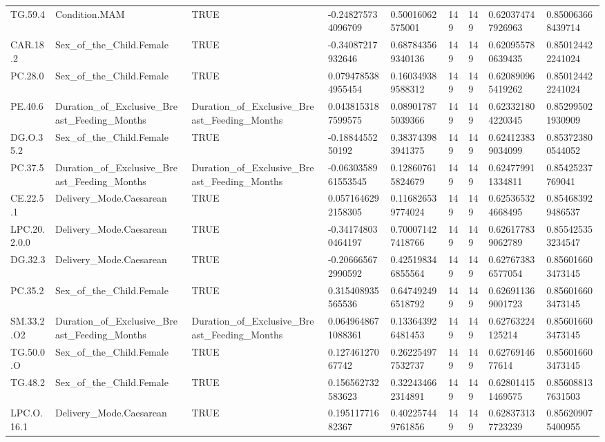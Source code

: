 \begin{longtable}{lllllllll}
TG.59.4 & Condition.MAM & TRUE & -0.248275734096709 & 0.50016062575001 & 149 & 149 & 0.620374747926963 & 0.850063668439714 \\
CAR.18.2 & Sex\_of\_the\_Child.Female & TRUE & -0.34087217932646 & 0.687843569340136 & 149 & 149 & 0.620955780639435 & 0.850124422241024 \\
PC.28.0 & Sex\_of\_the\_Child.Female & TRUE & 0.0794785384955454 & 0.160349389588312 & 149 & 149 & 0.620890965419262 & 0.850124422241024 \\
PE.40.6 & Duration\_of\_Exclusive\_Breast\_Feeding\_Months & Duration\_of\_Exclusive\_Breast\_Feeding\_Months & 0.0438153187599575 & 0.089017875039366 & 149 & 149 & 0.623321804220345 & 0.852995021930909 \\
DG.O.35.2 & Sex\_of\_the\_Child.Female & TRUE & -0.1884455250192 & 0.383743983941375 & 149 & 149 & 0.624123839034099 & 0.853723800544052 \\
PC.37.5 & Duration\_of\_Exclusive\_Breast\_Feeding\_Months & Duration\_of\_Exclusive\_Breast\_Feeding\_Months & -0.0630358961553545 & 0.128607615824679 & 149 & 149 & 0.624779911334811 & 0.85425237769041 \\
CE.22.5.1 & Delivery\_Mode.Caesarean & TRUE & 0.0571646292158305 & 0.116826539774024 & 149 & 149 & 0.625365324668495 & 0.854683929486537 \\
LPC.20.2.0.0 & Delivery\_Mode.Caesarean & TRUE & -0.341748030464197 & 0.700071427418766 & 149 & 149 & 0.626177839062789 & 0.855425353234547 \\
DG.32.3 & Delivery\_Mode.Caesarean & TRUE & -0.206665672990592 & 0.425198346855564 & 149 & 149 & 0.627673836577054 & 0.856016603473145 \\
PC.35.2 & Sex\_of\_the\_Child.Female & TRUE & 0.315408935565536 & 0.647492496518792 & 149 & 149 & 0.626911369001723 & 0.856016603473145 \\
SM.33.2.O2 & Duration\_of\_Exclusive\_Breast\_Feeding\_Months & Duration\_of\_Exclusive\_Breast\_Feeding\_Months & 0.0649648671088361 & 0.133643926481453 & 149 & 149 & 0.62763224125214 & 0.856016603473145 \\
TG.50.0.O & Sex\_of\_the\_Child.Female & TRUE & 0.12746127067742 & 0.262254977532737 & 149 & 149 & 0.6276914677614 & 0.856016603473145 \\
TG.48.2 & Sex\_of\_the\_Child.Female & TRUE & 0.156562732583623 & 0.322434662314891 & 149 & 149 & 0.628014151469575 & 0.856088137631503 \\
LPC.O.16.1 & Delivery\_Mode.Caesarean & TRUE & 0.19511771682367 & 0.402257449761856 & 149 & 149 & 0.628373137723239 & 0.856209075400955 \\

\end{longtable}
